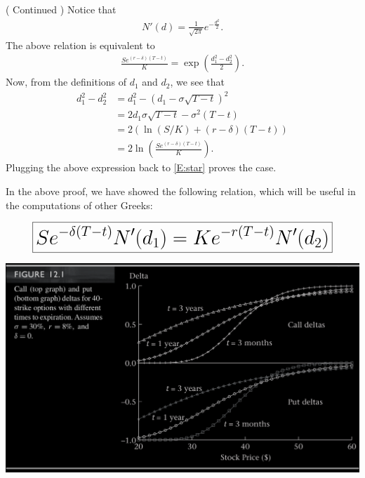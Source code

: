 \begin{frame}[fragile,t]
\begin{mysol}( Continued )
	Notice that
	\begin{align*}
		N'(d) = \frac{1}{\sqrt{2\pi}} e^{-\frac{d^2}{2}}.
	\end{align*}
	The above relation is equivalent to
	\begin{align}
		\tag{$\star$}
		\label{E:star}
		\frac{S e^{(r-\delta)(T-t)}}{K} = \exp\left(\frac{d_1^2-d_2^2}{2}\right).
	\end{align}
	Now, from the definitions of $d_1$ and $d_2$, we see that
	\begin{align*}
		d_1^2 - d_2^2 & = d_1^2 - \left(d_1-\sigma \sqrt{T-t}\right)^2 \\
                  & = 2d_1\sigma \sqrt{T-t} - \sigma^2 (T-t)       \\
									& = 2\left(\ln\left(S/K\right) + (r-\delta)(T-t)\right) \\
									& = 2 \ln\left(\frac{Se^{(r-\delta)(T-t)}}{K}\right).
	\end{align*}
	Plugging the above expression back to \eqref{E:star} proves the case. \myEnd
\end{mysol}
\end{frame}
\begin{frame}[fragile,t]
In the above proof, we have showed the following relation, which will be useful in the computations
of other Greeks:
\bigskip

\begin{align*}
	\huge
	\boxed{S e^{-\delta(T-t)} N'(d_1) = K e^{-r(T-t)} N'(d_2)}
\end{align*}
\end{frame}
\begin{frame}[fragile]
\begin{center}
	\includegraphics[scale=0.2]{figs/Figure-12-1.png}
\end{center}
\end{frame}
